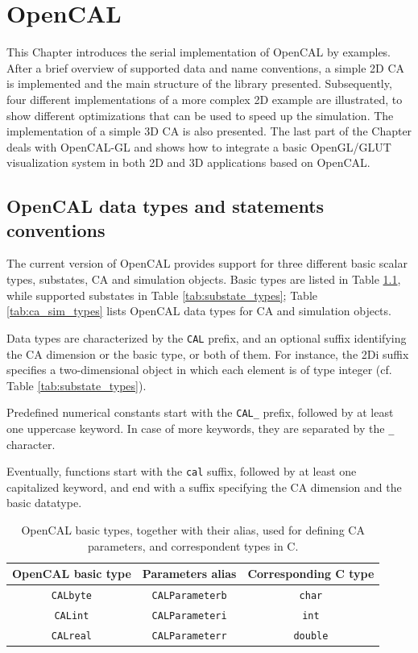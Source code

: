 \chapter{OpenCAL}\label{ch:opencal}

This Chapter introduces the serial implementation of OpenCAL by
examples. After a brief overview of supported data and name
conventions, a simple 2D CA is implemented and the main structure of
the library presented. Subsequently, four different implementations of
a more complex 2D example are illustrated, to show different
optimizations that can be used to speed up the simulation. The
implementation of a simple 3D CA is also presented. The last part of
the Chapter deals with OpenCAL-GL and shows how to integrate a basic
OpenGL/GLUT visualization system in both 2D and 3D applications based
on OpenCAL.


\section{OpenCAL data types and statements conventions}\label{sec:Conventions}

The current version of OpenCAL provides support for three different
basic scalar types, substates, CA and simulation objects. Basic types
are listed in Table \ref{tab:basic_types}, while supported substates
in Table \ref{tab:substate_types}; Table \ref{tab:ca_sim_types} lists
OpenCAL data types for CA and simulation objects.

Data types are characterized by the \verb'CAL' prefix, and an optional
suffix identifying the CA dimension or the basic type, or both of
them. For instance, the 2Di suffix specifies a two-dimensional object
in which each element is of type integer (cf. Table
\ref{tab:substate_types}).

Predefined numerical constants start with the \verb'CAL_' prefix,
followed by at least one uppercase keyword. In case of more keywords,
they are separated by the \verb'_' character.

Eventually, functions start with the \verb'cal' suffix, followed by at
least one capitalized keyword, and end with a suffix specifying the CA
dimension and the basic datatype.

\begin{table}
  \centering
  \begin{tabular}{c|c|c}
    \hline
    OpenCAL basic type & Parameters alias & Corresponding C type \\
    \hline
    \verb'CALbyte' & \verb'CALParameterb' & \verb'char'  \\
    \verb'CALint'  & \verb'CALParameteri' & \verb'int'  \\
    \verb'CALreal' & \verb'CALParameterr' & \verb'double'  \\
    \hline
  \end{tabular}
  \caption{OpenCAL basic types, together with their alias, used for
    defining CA parameters, and correspondent types in C.}
  \label{tab:basic_types}
\end{table}

